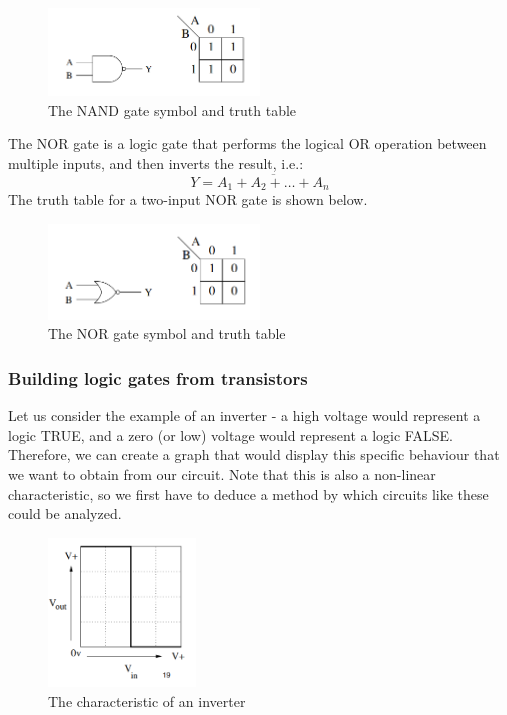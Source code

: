 \documentclass{article}
\begin{document}
\begin{figure}[h]
    \centering
    \includegraphics[width = 0.5\textwidth]{images/nand.png}
    \caption{The NAND gate symbol and truth table}
    \label{fig:enter-label}
\end{figure}

\begin{proposition}
    The NOR gate is a logic gate that performs the logical OR operation between multiple inputs, and then inverts the result, i.e.:
    \[ Y = \overline{A_1 + A_2 + \ldots + A_n} \]
    The truth table for a two-input NOR gate is shown below.
\end{proposition}

\begin{figure}[h]
    \centering
    \includegraphics[width = 0.5\textwidth]{images/nor.png}
    \caption{The NOR gate symbol and truth table}
    \label{fig:enter-label}
\end{figure}

\newpage

\subsubsection{Building logic gates from transistors}

Let us consider the example of an inverter - a high voltage would represent a logic TRUE, and a zero (or low) voltage would represent a logic FALSE. Therefore, we can create a graph that would display this specific behaviour that we want to obtain from our circuit. Note that this is also a non-linear characteristic, so we first have to deduce a method by which circuits like these could be analyzed.

\begin{figure}[h]
    \centering
    \includegraphics[width = 0.35\textwidth]{images/Screenshot 2024-04-06 110736.png}
    \caption{The characteristic of an inverter}
    \label{fig:enter-label}
\end{figure}
\end{document}

